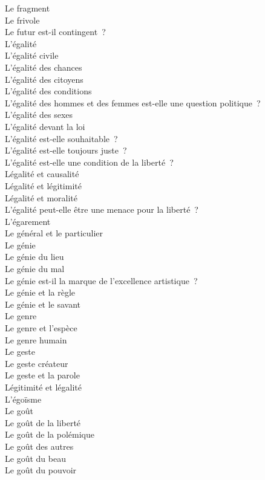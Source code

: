 \documentclass[a4paper,12pt]{article}
\begin{document}
Le fragment \\
Le frivole \\
Le futur est-il contingent ? \\
L'égalité \\
L'égalité civile \\
L'égalité des chances \\
L'égalité des citoyens \\
L'égalité des conditions \\
L'égalité des hommes et des femmes est-elle une question politique ? \\
L'égalité des sexes \\
L'égalité devant la loi \\
L'égalité est-elle souhaitable ? \\
L'égalité est-elle toujours juste ? \\
L'égalité est-elle une condition de la liberté ? \\
Légalité et causalité \\
Légalité et légitimité \\
Légalité et moralité \\
L'égalité peut-elle être une menace pour la liberté ? \\
L'égarement \\
Le général et le particulier \\
Le génie \\
Le génie du lieu \\
Le génie du mal \\
Le génie est-il la marque de l'excellence artistique ? \\
Le génie et la règle \\
Le génie et le savant \\
Le genre \\
Le genre et l'espèce \\
Le genre humain \\
Le geste \\
Le geste créateur \\
Le geste et la parole \\
Légitimité et légalité \\
L'égoïsme \\
Le goût \\
Le goût de la liberté \\
Le goût de la polémique \\
Le goût des autres \\
Le goût du beau \\
Le goût du pouvoir \\
\end{document}
